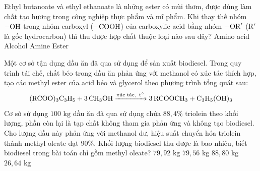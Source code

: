 \documentclass[11pt,a4paper]{article}
\begin{document}
\begin{ex}
Ethyl butanoate và ethyl ethanoate là những ester có mùi thơm, được dùng làm chất tạo hương trong công nghiệp thực phẩm và mĩ phẩm. Khi thay thế nhóm $\ce{-OH}$ trong nhóm carboxyl ($\ce{-COOH}$) của carboxylic acid bằng nhóm $-\ce{OR}'$ ($\text{R}'$ là gốc hydrocarbon) thì thu được hợp chất thuộc loại nào sau đây?
\choice
{Amino acid}
{Alcohol}
{Amine}
{\True Ester}



\end{ex}

\begin{ex}
Một cơ sở tận dụng dầu ăn đã qua sử dụng để sản xuất biodiesel. Trong quy trình tái chế, chất béo trong dầu ăn phản ứng với methanol có xúc tác thích hợp, tạo các methyl ester của acid béo và glycerol theo phương trình tổng quát sau:
\[ \ce{(RCOO)3C3H5 + 3CH3OH ->[\text{xúc tác},\, t^\circ] 3RCOOCH3 + C3H5(OH)3} \]
Cơ sở sử dụng $100\text{ kg}$ dầu ăn đã qua sử dụng chứa $88{,}4\%$ triolein theo khối lượng, phần còn lại là tạp chất không tham gia phản ứng và không tạo biodiesel. Cho lượng dầu này phản ứng với methanol dư, hiệu suất chuyển hóa triolein thành methyl oleate đạt $90\%$. Khối lượng biodiesel thu được là bao nhiêu, biết biodiesel trong bài toán chỉ gồm methyl oleate?
\choice
{\True $79{,}92\text{ kg}$}
{$79{,}56\text{ kg}$}
{$88{,}80\text{ kg}$}
{$26{,}64\text{ kg}$}



\end{ex}
\end{document}
